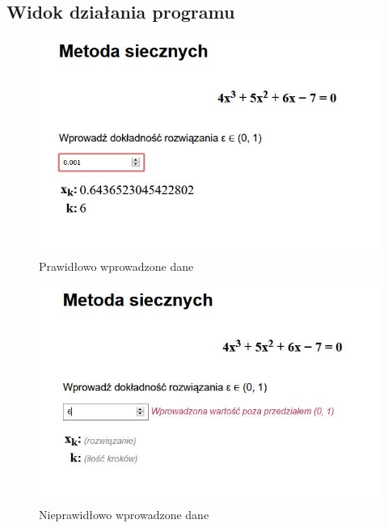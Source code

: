 \documentclass[12pt]{article}
\begin{document}
\subsection{Widok działania programu}
\begin{figure}[h]
\centering
\includegraphics[scale=0.65]{correctData.jpg}
\caption{Prawidłowo wprowadzone dane}
\end{figure}

\begin{figure}
\centering
\includegraphics[scale=0.65]{wrongData.jpg}
\caption{Nieprawidłowo wprowadzone dane}
\end{figure}
\end{document}
